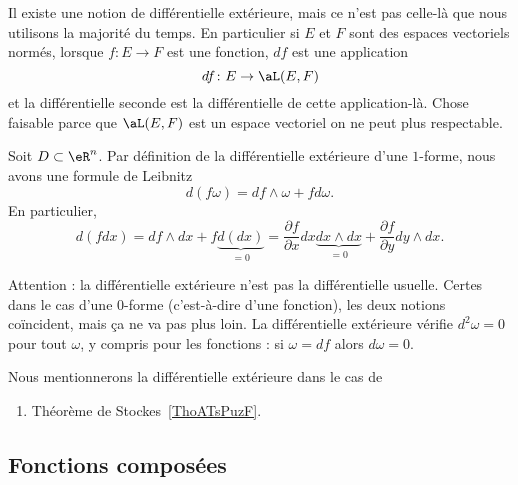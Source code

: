 Il existe une notion de différentielle extérieure, mais ce n'est pas celle-là que nous utilisons la majorité du temps. En particulier si \( E\) et \( F\) sont des espaces vectoriels normés, lorsque \( f\colon E\to F\) est une fonction, \( df\) est une application
\begin{equation}
    df\colon E\to \aL(E,F)
\end{equation}
et la différentielle seconde est la différentielle de cette application-là. Chose faisable parce que \( \aL(E,F)\) est un espace vectoriel on ne peut plus respectable.

Soit $D\subset\eR^n$. Par définition de la différentielle extérieure d'une $1$-forme, nous avons une formule de Leibnitz
\begin{equation}
    d(f\omega)=df\wedge\omega+fd\omega.
\end{equation}
En particulier,
\begin{equation}
    d(fdx)=df\wedge dx+f\underbrace{d(dx)}_{=0}=\frac{ \partial f }{ \partial x }dx\underbrace{dx\wedge dx}_{=0}+\frac{ \partial f }{ \partial y }dy\wedge dx.
\end{equation}

Attention : la différentielle extérieure n'est pas la différentielle usuelle. Certes dans le cas d'une \( 0\)-forme (c'est-à-dire d'une fonction), les deux notions coïncident, mais ça ne va pas plus loin. La différentielle extérieure vérifie \( d^2\omega=0\) pour tout \( \omega\), y compris pour les fonctions : si \( \omega=df\) alors \( d\omega=0\).



Nous mentionnerons la différentielle extérieure dans le cas de
\begin{enumerate}
    \item
        Théorème de Stockes~\ref{ThoATsPuzF}.
\end{enumerate}

\subsection{Fonctions composées}

